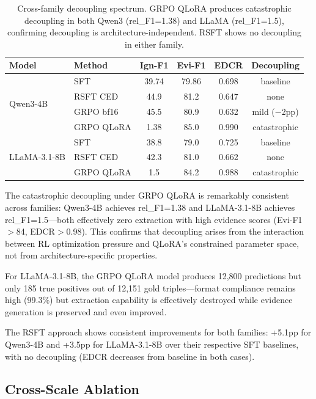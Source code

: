 \documentclass[11pt]{article}
\begin{document}
\begin{table}[t]
\centering
\small
\begin{tabular}{llcccc}
\toprule
\textbf{Model} & \textbf{Method} & \textbf{Ign-F1} & \textbf{Evi-F1} & \textbf{EDCR} & \textbf{Decoupling} \\
\midrule
\multirow{4}{*}{Qwen3-4B} & SFT & 39.74 & 79.86 & 0.698 & baseline \\
 & RSFT CED & 44.9 & 81.2 & 0.647 & none \\
 & GRPO bf16 & 45.5 & 80.9 & 0.632 & mild ($-$2pp) \\
 & GRPO QLoRA & 1.38 & 85.0 & 0.990 & catastrophic \\
\midrule
\multirow{3}{*}{LLaMA-3.1-8B} & SFT & 38.8 & 79.0 & 0.725 & baseline \\
 & RSFT CED & 42.3 & 81.0 & 0.662 & none \\
 & GRPO QLoRA & 1.5 & 84.2 & 0.988 & catastrophic \\
\bottomrule
\end{tabular}
\caption{Cross-family decoupling spectrum. GRPO QLoRA produces catastrophic decoupling in both Qwen3 (rel\_F1=1.38) and LLaMA (rel\_F1=1.5), confirming decoupling is architecture-independent. RSFT shows no decoupling in either family.}
\label{tab:decoupling}
\end{table}

The catastrophic decoupling under GRPO QLoRA is remarkably consistent across families: Qwen3-4B achieves rel\_F1=1.38 and LLaMA-3.1-8B achieves rel\_F1=1.5---both effectively zero extraction with high evidence scores (Evi-F1$>$84, EDCR$>$0.98). This confirms that decoupling arises from the interaction between RL optimization pressure and QLoRA's constrained parameter space, not from architecture-specific properties.

For LLaMA-3.1-8B, the GRPO QLoRA model produces 12,800 predictions but only 185 true positives out of 12,151 gold triples---format compliance remains high (99.3\%) but extraction capability is effectively destroyed while evidence generation is preserved and even improved.

The RSFT approach shows consistent improvements for both families: +5.1pp for Qwen3-4B and +3.5pp for LLaMA-3.1-8B over their respective SFT baselines, with no decoupling (EDCR decreases from baseline in both cases).

\subsection{Cross-Scale Ablation}
\end{document}
